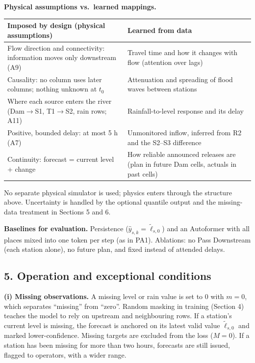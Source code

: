 \textbf{Physical assumptions vs.\ learned mappings.}
\begin{table}[H]\centering\small
\begin{tabularx}{\linewidth}{@{}LL@{}}
\toprule
Imposed by design (physical assumptions) & Learned from data\\
\midrule
Flow direction and connectivity: information moves only downstream (A9) & Travel time and how it changes with flow (attention over lags)\\
Causality: no column uses later columns; nothing unknown at $t_0$ & Attenuation and spreading of flood waves between stations\\
Where each source enters the river (Dam$\to$S1, T1$\to$S2, rain rows; A11) & Rainfall-to-level response and its delay\\
Positive, bounded delay: at most 5 h (A7) & Unmonitored inflow, inferred from R2 and the S2--S3 difference\\
Continuity: forecast = current level + change & How reliable announced releases are (plan in future Dam cells, actuals in past cells)\\
\bottomrule
\end{tabularx}
\end{table}
No separate physical simulator is used; physics enters through the structure above. Uncertainty is handled by the optional quantile output and the missing-data treatment in Sections 5 and 6.

\textbf{Baselines for evaluation.} Persistence ($\hat y_{s,k}=\tilde\ell_{s,0}$) and an Autoformer with all places mixed into one token per step (as in PA1). Ablations: no Pass Downstream (each station alone), no future plan, and fixed instead of attended delays.

\subsection*{5. Operation and exceptional conditions}

\textbf{(i) Missing observations.} A missing level or rain value is set to 0 with $m=0$, which separates ``missing'' from ``zero''. Random masking in training (Section 4) teaches the model to rely on upstream and neighbouring rows. If a station's current level is missing, the forecast is anchored on its latest valid value $\tilde\ell_{s,0}$ and marked lower-confidence. Missing targets are excluded from the loss ($M=0$). If a station has been missing for more than two hours, forecasts are still issued, flagged to operators, with a wider range.

